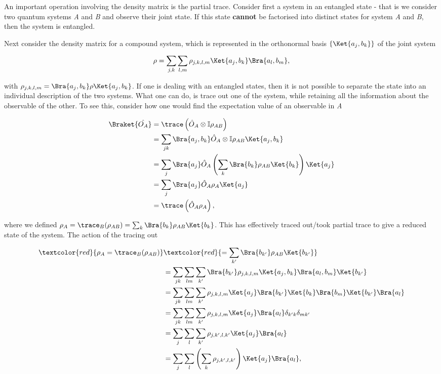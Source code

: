 An important operation involving the density matrix is the partial trace. Consider first a system in an entangled state - that is we consider two quantum systems \textit{A} and \textit{B} and observe their joint state. If this state \textbf{cannot} be factorised into distinct states for system \textit{A} and \textit{B}, then the system is entangled.

Next consider the density matrix for a compound system, which is represented in the orthonormal basis $\left\lbrace \Ket{a_j,b_k}\right\rbrace $ of the joint system

\begin{equation}
\rho = \sum_{j,k}\sum_{l,m} \rho_{j,k,l,m}\Ket{a_j,b_k}\Bra{a_l,b_m},
\end{equation}

with $\rho_{j,k,l,m} = \Bra{a_j,b_k}\rho\Ket{a_j,b_k}$. If one is dealing with an entangled states, then it is not possible to separate the state into an individual description of the two systems. What one can do, is trace out one of the system, while retaining all the information about the observable of the other. To see this, consider how one would find the expectation value of an observable in \textit{A}

\begin{equation}
\begin{aligned}
\Braket{\hat{O_A}} & = \trace\left( \hat{O}_A\otimes \mathbb{I} \rho_{AB}\right) \\
& = \sum_{jk} \Bra{a_j,b_k} \hat{O}_A\otimes \mathbb{I} \rho_{AB} \Ket{a_j,b_k}\\
& = \sum_j\Bra{a_j}\hat{O}_A\left( \sum_k\Bra{b_k}\rho_{AB}\Ket{b_k}\right) \Ket{a_j} \\
& = \sum_j\Bra{a_j}\hat{O}_A\rho_A \Ket{a_j}\\
& = \trace\left( \hat{O}_A\rho_A \right),
\end{aligned}
\end{equation}

\noindent where we defined $\rho_A = \trace_B(\rho_{AB}) = \sum_{k} \Bra{b_{k}}\rho_{AB}\Ket{b_{k}}$. This has effectively traced out/took partial trace to give a reduced state of the system. The action of the tracing out

\begin{equation}
\begin{aligned}
\textcolor{red}{\rho_A = \trace_B(\rho_{AB})} &  \textcolor{red}{= \sum_{k'} \Bra{b_{k'}}\rho_{AB}\Ket{b_{k'}}}\\
& = \sum_{jk}\sum_{lm}\sum_{k'} \Bra{b_{k'}}\rho_{j,k,l,m}\Ket{a_j,b_k}\Bra{a_l,b_m}\Ket{b_{k'}}\\
& = \sum_{jk}\sum_{lm}\sum_{k'} \rho_{j,k,l,m}\Ket{a_j}\Bra{b_{k'}}\Ket{b_k}\Bra{b_m}\Ket{b_{k'}}\Bra{a_l}\\
& = \sum_{jk}\sum_{lm}\sum_{k'} \rho_{j,k,l,m}\Ket{a_j}\Bra{a_l}\delta_{k'k}\delta_{mk'}\\
& = \sum_{j}\sum_{l}\sum_{k'} \rho_{j,k',l,k'}\Ket{a_j}\Bra{a_l}\\
& = \sum_{j}\sum_{l}\left( \sum_{k}\rho_{j,k',l,k'}\right) \Ket{a_j}\Bra{a_l},
\end{aligned}
\end{equation}


